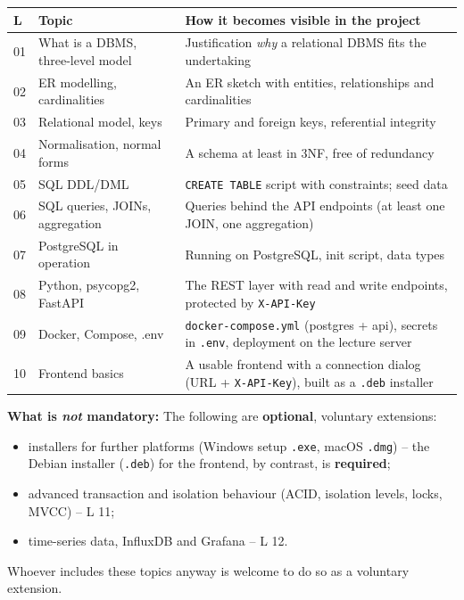 \documentclass[11pt,a4paper]{article}
\begin{document}
\renewcommand{\arraystretch}{1.3}
\begin{tabularx}{\linewidth}{@{}p{1.2cm}p{4.4cm}X@{}}
\toprule
\textbf{L} & \textbf{Topic} & \textbf{How it becomes visible in the project} \\
\midrule
01 & What is a DBMS, three-level model & Justification \emph{why} a relational
     DBMS fits the undertaking \\
02 & ER modelling, cardinalities & An ER sketch with entities, relationships and
     cardinalities \\
03 & Relational model, keys & Primary and foreign keys, referential integrity \\
04 & Normalisation, normal forms & A schema at least in 3NF, free of redundancy \\
05 & SQL DDL/DML & \texttt{CREATE TABLE} script with constraints; seed data \\
06 & SQL queries, JOINs, aggregation & Queries behind the API endpoints (at
     least one JOIN, one aggregation) \\
07 & PostgreSQL in operation & Running on PostgreSQL, init script, data types \\
08 & Python, psycopg2, FastAPI & The REST layer with read and write endpoints,
     protected by \texttt{X-API-Key} \\
09 & Docker, Compose, .env & \texttt{docker-compose.yml} (postgres + api),
     secrets in \texttt{.env}, deployment on the lecture server \\
10 & Frontend basics & A usable frontend with a connection dialog (URL +
     \texttt{X-API-Key}), built as a \texttt{.deb} installer \\
\bottomrule
\end{tabularx}

\begin{infobox}
\textbf{What is \emph{not} mandatory:} The following are \textbf{optional},
voluntary extensions:
\begin{itemize}[leftmargin=1.4em, topsep=2pt]
  \item installers for further platforms (Windows setup \texttt{.exe}, macOS
        \texttt{.dmg}) -- the Debian installer (\texttt{.deb}) for the frontend,
        by contrast, is \textbf{required};
  \item advanced transaction and isolation behaviour (ACID, isolation levels,
        locks, MVCC) -- L 11;
  \item time-series data, InfluxDB and Grafana -- L 12.
\end{itemize}
Whoever includes these topics anyway is welcome to do so as a voluntary
extension.
\end{infobox}
\end{document}
